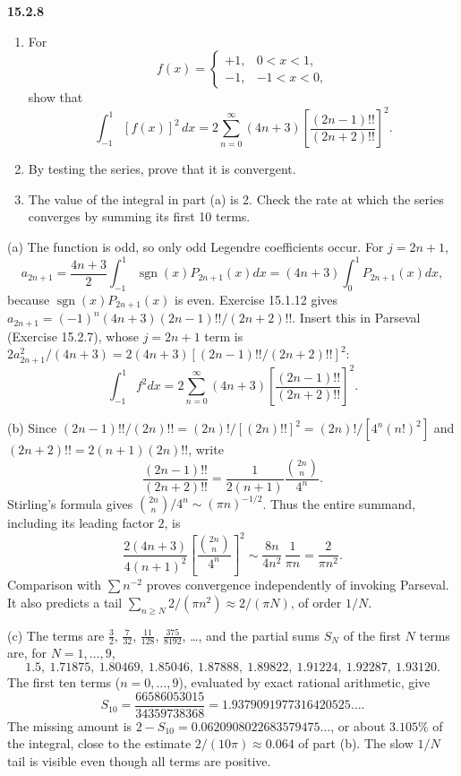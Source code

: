 \par\bigskip
\noindent\textbf{15.2.8}
\begin{enumerate}
\item[(a)] For
\[
f(x)=\begin{cases}+1,&0<x<1,\\-1,&-1<x<0,\end{cases}
\]
show that
\[
\int_{-1}^{1}[f(x)]^{2}\,dx
=2\sum_{n=0}^{\infty}(4n+3)\left[\frac{(2n-1)!!}{(2n+2)!!}\right]^{2}.
\]
\item[(b)] By testing the series, prove that it is convergent.
\item[(c)] The value of the integral in part (a) is 2. Check the rate
at which the series converges by summing its first 10 terms.
\end{enumerate}
\solution
(a) The function is odd, so only odd Legendre coefficients occur.
For $j=2n+1$,
\[
a_{2n+1}=\frac{4n+3}{2}\int_{-1}^1\operatorname{sgn}(x)P_{2n+1}(x)dx
=(4n+3)\int_0^1P_{2n+1}(x)dx,
\]
because $\operatorname{sgn}(x)P_{2n+1}(x)$ is even.
Exercise 15.1.12 gives
$a_{2n+1}=(-1)^n(4n+3)(2n-1)!!/(2n+2)!!$.
Insert this in Parseval (Exercise 15.2.7), whose $j=2n+1$ term is
$2a_{2n+1}^2/(4n+3)=2(4n+3)[(2n-1)!!/(2n+2)!!]^2$:
\[
\int_{-1}^1f^2dx
=2\sum_{n=0}^\infty(4n+3)
\left[\frac{(2n-1)!!}{(2n+2)!!}\right]^2.
\]

(b) Since $(2n-1)!!/(2n)!!=(2n)!/[(2n)!!]^2=(2n)!/[4^n(n!)^2]$ and
$(2n+2)!!=2(n+1)(2n)!!$, write
\[
\frac{(2n-1)!!}{(2n+2)!!}
=\frac1{2(n+1)}\frac{\binom{2n}{n}}{4^n}.
\]
Stirling's formula gives $\binom{2n}{n}/4^n\sim(\pi n)^{-1/2}$.
Thus the entire summand, including its leading factor $2$, is
\[
\frac{2(4n+3)}{4(n+1)^2}\left[\frac{\binom{2n}{n}}{4^n}\right]^2
\sim\frac{8n}{4n^2}\,\frac1{\pi n}=\frac2{\pi n^2}.
\]
Comparison with $\sum n^{-2}$
proves convergence independently of invoking Parseval.
It also predicts a tail $\sum_{n\ge N}2/(\pi n^2)\approx2/(\pi N)$,
of order $1/N$.

(c) The terms are $\frac32$, $\frac7{32}$, $\frac{11}{128}$,
$\frac{375}{8192}$, \ldots, and the partial sums $S_N$ of the first $N$
terms are, for $N=1,\ldots,9$,
\[
1.5,\ 1.71875,\ 1.80469,\ 1.85046,\ 1.87888,\ 1.89822,\ 1.91224,\
1.92287,\ 1.93120.
\]
The first ten terms ($n=0,\ldots,9$), evaluated by exact rational
arithmetic, give
\[
\boxed{S_{10}=\frac{66586053015}{34359738368}
=1.9379091977316420525\ldots}.
\]
The missing amount is $2-S_{10}=0.0620908022683579475\ldots$,
or about $3.105\%$ of the integral, close to the estimate
$2/(10\pi)\approx0.064$ of part (b). The slow $1/N$ tail is visible
even though all terms are positive.


